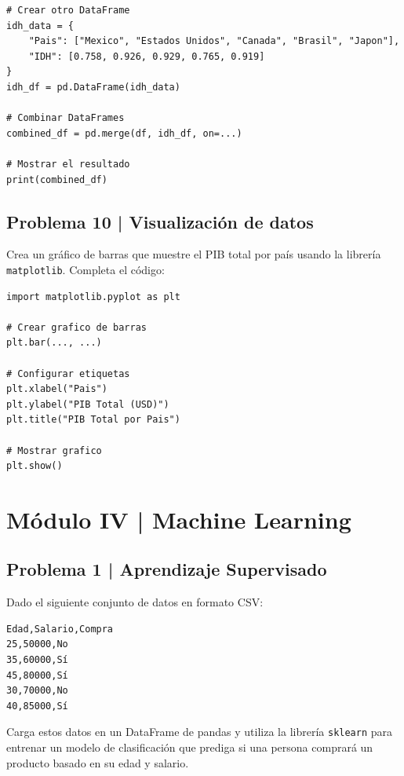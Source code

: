 \documentclass{article}
\begin{document}
\begin{lstlisting}[style=python]
# Crear otro DataFrame
idh_data = {
    "Pais": ["Mexico", "Estados Unidos", "Canada", "Brasil", "Japon"],
    "IDH": [0.758, 0.926, 0.929, 0.765, 0.919]
}
idh_df = pd.DataFrame(idh_data)

# Combinar DataFrames
combined_df = pd.merge(df, idh_df, on=...)

# Mostrar el resultado
print(combined_df)
\end{lstlisting}

\clearpage

\subsection*{Problema 10 | Visualización de datos}

Crea un gráfico de barras que muestre el PIB total por país usando la librería \texttt{matplotlib}. Completa el código:

\begin{lstlisting}[style=python]
import matplotlib.pyplot as plt

# Crear grafico de barras
plt.bar(..., ...)

# Configurar etiquetas
plt.xlabel("Pais")
plt.ylabel("PIB Total (USD)")
plt.title("PIB Total por Pais")

# Mostrar grafico
plt.show()
\end{lstlisting}

\section*{Módulo IV | Machine Learning}


\subsection*{Problema 1 | Aprendizaje Supervisado}

Dado el siguiente conjunto de datos en formato CSV:

\begin{verbatim}
Edad,Salario,Compra
25,50000,No
35,60000,Sí
45,80000,Sí
30,70000,No
40,85000,Sí
\end{verbatim}

Carga estos datos en un DataFrame de pandas y utiliza la librería \texttt{sklearn} para entrenar un modelo de clasificación que prediga si una persona comprará un producto basado en su edad y salario.
\end{document}

